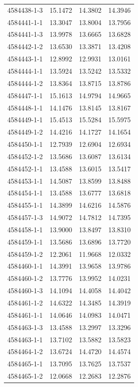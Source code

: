 \begin{longtable}{lrrr}
4584438-1-3 & 15.1472 & 14.3802 & 14.3946 \\
4584441-1-1 & 13.3047 & 13.8004 & 13.7956 \\
4584441-1-3 & 13.9978 & 13.6665 & 13.6828 \\
4584442-1-2 & 13.6530 & 13.3871 & 13.4208 \\
4584443-1-1 & 12.8992 & 12.9931 & 13.0161 \\
4584444-1-1 & 13.5924 & 13.5242 & 13.5332 \\
4584444-1-2 & 13.8364 & 13.8715 & 13.8786 \\
4584447-1-1 & 15.1613 & 14.9794 & 14.9665 \\
4584448-1-1 & 14.1476 & 13.8145 & 13.8167 \\
4584449-1-1 & 15.4513 & 15.5284 & 15.5975 \\
4584449-1-2 & 14.4216 & 14.1727 & 14.1654 \\
4584450-1-1 & 12.7939 & 12.6904 & 12.6934 \\
4584452-1-2 & 13.5686 & 13.6087 & 13.6134 \\
4584452-1-1 & 13.4588 & 13.6015 & 13.5417 \\
4584453-1-1 & 14.5087 & 13.8599 & 13.8488 \\
4584454-1-1 & 13.4588 & 13.6777 & 13.6818 \\
4584455-1-1 & 14.3899 & 14.6216 & 14.5876 \\
4584457-1-3 & 14.9072 & 14.7812 & 14.7395 \\
4584458-1-1 & 13.9000 & 13.8497 & 13.8310 \\
4584459-1-1 & 13.5686 & 13.6896 & 13.7720 \\
4584459-1-2 & 12.2061 & 11.9668 & 12.0332 \\
4584460-1-1 & 14.3991 & 13.9658 & 13.9786 \\
4584460-1-2 & 13.7776 & 13.9952 & 14.0231 \\
4584460-1-3 & 14.1094 & 14.4058 & 14.4042 \\
4584461-1-2 & 14.6322 & 14.3485 & 14.3919 \\
4584461-1-1 & 14.0646 & 14.0983 & 14.0471 \\
4584463-1-3 & 13.4588 & 13.2997 & 13.3296 \\
4584463-1-1 & 13.7102 & 13.5882 & 13.5823 \\
4584464-1-2 & 13.6724 & 14.4720 & 14.4574 \\
4584465-1-1 & 13.7095 & 13.7625 & 13.7537 \\
4584465-1-2 & 12.0668 & 12.2683 & 12.2876 \\

\end{longtable}
